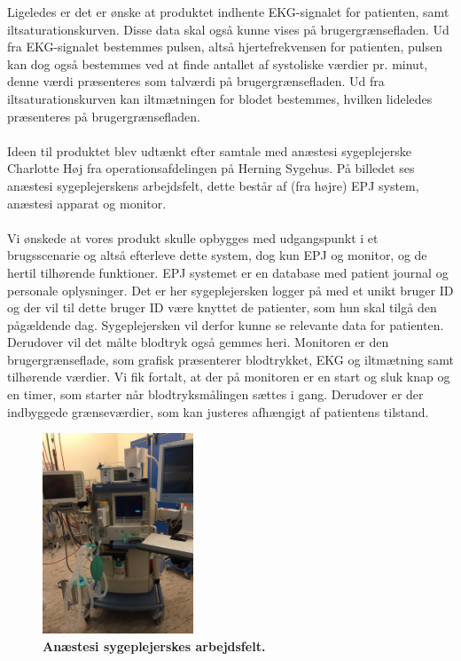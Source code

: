 Ligeledes er det er ønske at produktet indhente EKG-signalet for patienten, samt iltsaturationskurven. Disse data skal også kunne vises på brugergrænsefladen. Ud fra EKG-signalet bestemmes pulsen, altså hjertefrekvensen for patienten, pulsen kan dog også bestemmes ved at finde antallet af systoliske værdier pr. minut, denne værdi præsenteres som talværdi på brugergrænsefladen. Ud fra iltsaturationskurven kan iltmætningen for blodet bestemmes, hvilken lideledes præsenteres på brugergrænsefladen. \\
\\
Ideen til produktet blev udtænkt efter samtale med anæstesi sygeplejerske Charlotte Høj fra operationsafdelingen på Herning Sygehus. På billedet ses anæstesi sygeplejerskens arbejdsfelt, dette består af (fra højre) EPJ system, anæstesi apparat og monitor.
\\\\
Vi ønskede at vores produkt skulle opbygges med udgangspunkt i et brugsscenarie og altså efterleve dette system, dog kun EPJ og monitor, og de hertil tilhørende funktioner. EPJ systemet er en database med patient journal og personale oplysninger. Det er her sygeplejersken logger på med et unikt bruger ID og der vil til dette bruger ID være knyttet de patienter, som hun skal tilgå den pågældende dag. Sygeplejersken vil derfor kunne se relevante data for patienten. Derudover vil det målte blodtryk også gemmes heri. Monitoren er den brugergrænseflade, som grafisk præsenterer blodtrykket, EKG og iltmætning samt tilhørende værdier. Vi fik fortalt, at der på monitoren er en start og sluk knap og en timer, som starter når blodtryksmålingen sættes i gang. Derudover er der indbyggede grænseværdier, som kan justeres afhængigt af patientens tilstand. 
\begin{figure}[H]
\includegraphics[width =0.4\textwidth , center]{billeder/anastesi}
\caption{\textbf{Anæstesi sygeplejerskes arbejdsfelt.}}
\end{figure}

